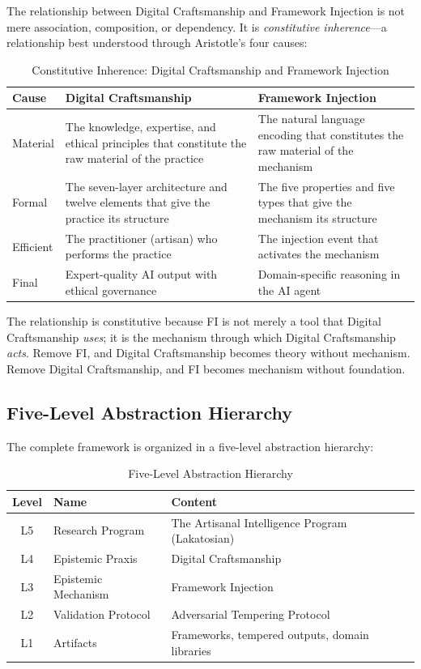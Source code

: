 \documentclass[12pt,a4paper]{article}
\begin{document}
The relationship between Digital Craftsmanship and Framework Injection is not mere association, composition, or dependency. It is \emph{constitutive inherence}---a relationship best understood through Aristotle's four causes:

\begin{table}[H]
\centering
\caption{Constitutive Inherence: Digital Craftsmanship and Framework Injection}
\label{tab:causes}
\begin{tabular}{@{}lp{4.5cm}p{5cm}@{}}
\toprule
\textbf{Cause} & \textbf{Digital Craftsmanship} & \textbf{Framework Injection} \\
\midrule
Material & The knowledge, expertise, and ethical principles that constitute the raw material of the practice & The natural language encoding that constitutes the raw material of the mechanism \\
Formal & The seven-layer architecture and twelve elements that give the practice its structure & The five properties and five types that give the mechanism its structure \\
Efficient & The practitioner (artisan) who performs the practice & The injection event that activates the mechanism \\
Final & Expert-quality AI output with ethical governance & Domain-specific reasoning in the AI agent \\
\bottomrule
\end{tabular}
\end{table}

The relationship is constitutive because FI is not merely a tool that Digital Craftsmanship \emph{uses}; it is the mechanism through which Digital Craftsmanship \emph{acts}. Remove FI, and Digital Craftsmanship becomes theory without mechanism. Remove Digital Craftsmanship, and FI becomes mechanism without foundation.

\subsection{Five-Level Abstraction Hierarchy}

The complete framework is organized in a five-level abstraction hierarchy:

\begin{table}[H]
\centering
\caption{Five-Level Abstraction Hierarchy}
\label{tab:hierarchy}
\begin{tabular}{@{}clp{6.5cm}@{}}
\toprule
\textbf{Level} & \textbf{Name} & \textbf{Content} \\
\midrule
L5 & Research Program & The Artisanal Intelligence Program (Lakatosian) \\
L4 & Epistemic Praxis & Digital Craftsmanship \\
L3 & Epistemic Mechanism & Framework Injection \\
L2 & Validation Protocol & Adversarial Tempering Protocol \\
L1 & Artifacts & Frameworks, tempered outputs, domain libraries \\
\bottomrule
\end{tabular}
\end{table}
\end{document}
